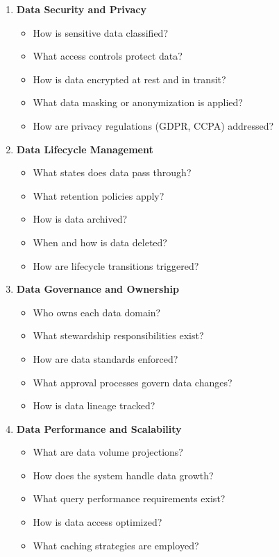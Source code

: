 \documentclass[11pt,letterpaper]{article}
\begin{document}
\begin{enumerate}[label=\textbf{C\arabic*:}, leftmargin=2.5em]
    \item \textbf{Data Security and Privacy}
    \begin{itemize}[nosep]
        \item How is sensitive data classified?
        \item What access controls protect data?
        \item How is data encrypted at rest and in transit?
        \item What data masking or anonymization is applied?
        \item How are privacy regulations (GDPR, CCPA) addressed?
    \end{itemize}
    
    \item \textbf{Data Lifecycle Management}
    \begin{itemize}[nosep]
        \item What states does data pass through?
        \item What retention policies apply?
        \item How is data archived?
        \item When and how is data deleted?
        \item How are lifecycle transitions triggered?
    \end{itemize}
    
    \item \textbf{Data Governance and Ownership}
    \begin{itemize}[nosep]
        \item Who owns each data domain?
        \item What stewardship responsibilities exist?
        \item How are data standards enforced?
        \item What approval processes govern data changes?
        \item How is data lineage tracked?
    \end{itemize}
    
    \item \textbf{Data Performance and Scalability}
    \begin{itemize}[nosep]
        \item What are data volume projections?
        \item How does the system handle data growth?
        \item What query performance requirements exist?
        \item How is data access optimized?
        \item What caching strategies are employed?
    \end{itemize}
    

\end{enumerate}
\end{document}
